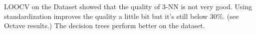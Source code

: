 LOOCV on the Dataset showed that the quality of 3-NN is not very good.
Using standardization improves the quality a little bit but it's still below 30\%.
(see Octave results.) 
The decision trees perform better on the dataset.
 
 